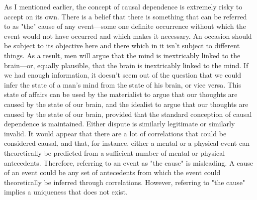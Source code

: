 \documentclass[a4paper,12pt]{book}[2004/02/16]
\theoremstyle{ilemma}
\theoremstyle{itheorem}
\theoremstyle{iother}
\theoremstyle{icorollary}
\theoremstyle{numcorollary}
\theoremstyle{idefinition}
\begin{document}
As I mentioned earlier, the concept of causal dependence is extremely risky to accept on its own. There is a belief that there is something that can be referred to as "the" cause of any event—some one definite occurrence without which the event would not have occurred and which makes it necessary. An occasion should be subject to its objective
here and there which in it isn't subject to different things. As a result, men will argue that the mind is inextricably linked to the brain—or, equally plausible, that the brain is inextricably linked to the mind. If we had enough information, it doesn't seem out of the question that we could infer the state of a man's mind from the state of his brain, or vice versa. This state of affairs can be used by the materialist to argue that our thoughts are caused by the state of our brain, and the idealist to argue that our thoughts are caused by the state of our brain, provided that the standard conception of causal dependence is maintained. Either dispute is similarly legitimate or similarly
invalid. It would appear that there are a lot of correlations that could be considered causal, and that, for instance, either a mental or a physical event can theoretically be predicted from a sufficient number of mental or physical antecedents. Therefore, referring to an event as "the cause" is misleading. A cause of an event could be any set of antecedents from which the event could theoretically be inferred through correlations. However, referring to "the cause" implies a uniqueness that does not exist.
\end{document}
